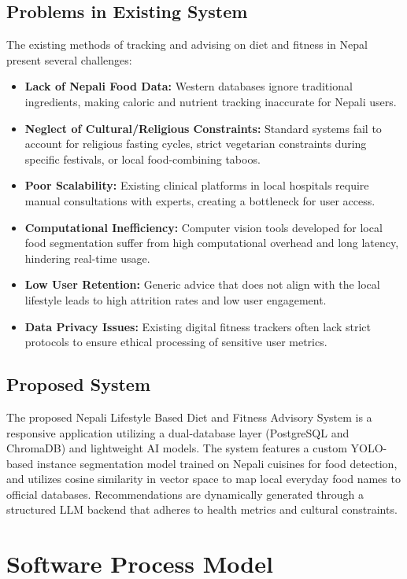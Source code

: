 \documentclass[11pt,a4paper]{article}
\begin{document}
\subsection{Problems in Existing System}
The existing methods of tracking and advising on diet and fitness in Nepal present several challenges:
\begin{itemize}[leftmargin=*]
\item \textbf{Lack of Nepali Food Data:} Western databases ignore traditional ingredients, making caloric and nutrient tracking inaccurate for Nepali users.
\item \textbf{Neglect of Cultural/Religious Constraints:} Standard systems fail to account for religious fasting cycles, strict vegetarian constraints during specific festivals, or local food-combining taboos.
\item \textbf{Poor Scalability:} Existing clinical platforms in local hospitals require manual consultations with experts, creating a bottleneck for user access.
\item \textbf{Computational Inefficiency:} Computer vision tools developed for local food segmentation suffer from high computational overhead and long latency, hindering real-time usage.
\item \textbf{Low User Retention:} Generic advice that does not align with the local lifestyle leads to high attrition rates and low user engagement.
\item \textbf{Data Privacy Issues:} Existing digital fitness trackers often lack strict protocols to ensure ethical processing of sensitive user metrics.
\end{itemize}

\subsection{Proposed System}
The proposed Nepali Lifestyle Based Diet and Fitness Advisory System is a responsive application utilizing a dual-database layer (PostgreSQL and ChromaDB) and lightweight AI models. The system features a custom YOLO-based instance segmentation model trained on Nepali cuisines for food detection, and utilizes cosine similarity in vector space to map local everyday food names to official databases. Recommendations are dynamically generated through a structured LLM backend that adheres to health metrics and cultural constraints.


\section{Software Process Model}
\end{document}
